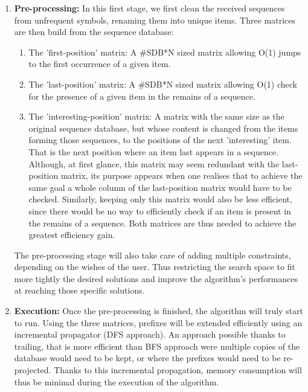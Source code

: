 \documentclass{eplmastersthesis}
\begin{document}
\begin{enumerate}
\item \textbf{Pre-processing:} In this first stage, we first clean the received sequences from unfrequent symbols, renaming them into unique items. Three matrices are then build from the sequence database:
	\begin{enumerate}
		\item The 'first-position' matrix: A \#SDB*N sized matrix allowing O(1) jumps to the first occurrence of a given item. 
		\item The 'last-position' matrix: A  \#SDB*N sized matrix allowing O(1) check for the presence of a given item in the remains of a sequence.
		\item The 'interesting-position' matrix: A matrix with the same size as the original sequence database, but whose content is changed from the items forming those sequences, to the positions of the next 'interesting' item. That is the next position where an item last appears in a sequence. \\ Although, at first glance, this matrix may seem redundant with the last-position matrix, its purpose appears when one realises that to achieve the same goal a whole column of the last-position matrix would have to be checked. Similarly, keeping only this matrix would also be less efficient, since there would be no way to efficiently check if an item is present in the remains of a sequence. Both matrices are thus needed to achieve the greatest efficiency gain. 
	\end{enumerate}
	
	The pre-processing stage will also take care of adding multiple constraints, depending on the wishes of the user. Thus restricting the search space to fit more tightly the desired solutions and improve the algorithm's performances at reaching those specific solutions.
	
\item \textbf{Execution:} Once the pre-processing is finished, the algorithm will truly start to run. Using the three matrices, prefixes will be extended efficiently using an incremental propagator (DFS approach). An approach possible thanks to trailing, that is more efficient than BFS approach were multiple copies of the database would need to be kept, or where the prefixes would need to be re-projected. Thanks to this incremental propagation, memory consumption will thus be minimal during the execution of the algorithm. \newline


\end{enumerate}
\end{document}
